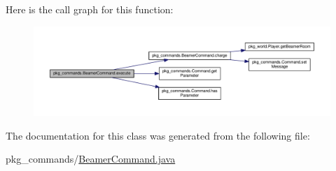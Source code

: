 Here is the call graph for this function\-:
\nopagebreak
\begin{figure}[H]
\begin{center}
\leavevmode
\includegraphics[width=350pt]{classpkg__commands_1_1BeamerCommand_a139dc852e180cabd8af15cfed37dcf0e_cgraph}
\end{center}
\end{figure}




The documentation for this class was generated from the following file\-:\begin{DoxyCompactItemize}
\item 
pkg\-\_\-commands/\hyperlink{BeamerCommand_8java}{Beamer\-Command.\-java}\end{DoxyCompactItemize}
